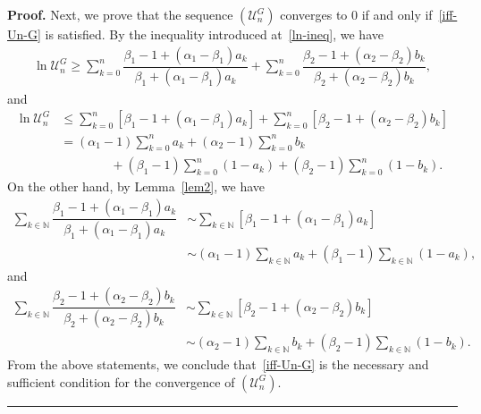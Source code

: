 \documentclass[a4paper, 11pt]{article}
\newenvironment{proof}[1][Proof]{\textbf{#1.} }{\hfill\rule{0.5em}{0.5em}}
\begin{document}
\begin{proof}
Next, we prove that the sequence $(\mathcal{U}_n^G)$ converges to $0$ if and only if~\eqref{iff-Un-G} is satisfied. By the inequality introduced at~\eqref{ln-ineq}, we have
\begin{align*}
\ln \mathcal{U}_n^G \ge \sum_{k=0}^{n} \dfrac{\beta_1 - 1 + (\alpha_1 - \beta_1)a_k}{\beta_1 + (\alpha_1 - \beta_1)a_k} + \sum_{k=0}^{n} \dfrac{\beta_2 - 1 + (\alpha_2 - \beta_2)b_k}{\beta_2 + (\alpha_2 - \beta_2)b_k}, 
\end{align*}
and
\begin{align*}
\ln \mathcal{U}_n^G &\le \sum_{k=0}^{n} [\beta_1 - 1 + (\alpha_1 - \beta_1)a_k] + \sum_{k=0}^{n} [\beta_2 - 1 + (\alpha_2 - \beta_2)b_k] \\
&= (\alpha_1 - 1)\sum_{k=0}^{n} a_k + (\alpha_2 - 1)\sum_{k=0}^{n} b_k \\
& \qquad \qquad + (\beta_1 - 1) \sum_{k=0}^{n} (1 - a_k) + (\beta_2 - 1)\sum_{k=0}^{n} (1 - b_k).
\end{align*}
On the other hand, by Lemma~\ref{lem2}, we have
\begin{align*}
\sum_{k \in \mathbb{N}} \dfrac{\beta_1 - 1 + (\alpha_1 - \beta_1)a_k}{\beta_1 + (\alpha_1 - \beta_1)a_k} &\sim  \sum_{k \in \mathbb{N}} [\beta_1 - 1 + (\alpha_1 - \beta_1)a_k] \\
&\sim (\alpha_1 - 1) \sum_{k \in \mathbb{N}} a_k + (\beta_1 - 1) \sum_{k \in \mathbb{N}} (1- a_k),
\end{align*}
and 
\begin{align*}
\sum_{k \in \mathbb{N}} \dfrac{\beta_2 - 1 + (\alpha_2 - \beta_2)b_k}{\beta_2 + (\alpha_2 - \beta_2)b_k} &\sim  \sum_{k \in \mathbb{N}} [\beta_2 - 1 + (\alpha_2 - \beta_2)b_k] \\
&\sim  (\alpha_2 - 1) \sum_{k \in \mathbb{N}} b_k + (\beta_2 - 1) \sum_{k \in \mathbb{N}} (1- b_k).
\end{align*}
From the above statements, we conclude that~\eqref{iff-Un-G} is the necessary and sufficient condition for the convergence of $(\mathcal{U}_n^G)$. 
\end{proof}
\end{document}
